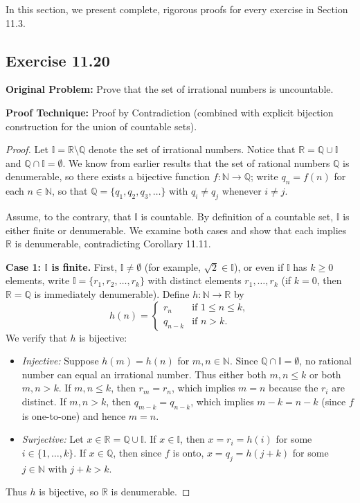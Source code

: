 \documentclass[11pt, letterpaper]{article}
\theoremstyle{definition}
\theoremstyle{remark}
\begin{document}
In this section, we present complete, rigorous proofs for every exercise in Section 11.3.

\subsection{Exercise 11.20}

\textbf{Original Problem:} Prove that the set of irrational numbers is uncountable.

\textbf{Proof Technique:} Proof by Contradiction (combined with explicit bijection construction for the union of countable sets).

\begin{proof}
Let $\mathbb{I} = \mathbb{R} \setminus \mathbb{Q}$ denote the set of irrational numbers. Notice that $\mathbb{R} = \mathbb{Q} \cup \mathbb{I}$ and $\mathbb{Q} \cap \mathbb{I} = \emptyset$. We know from earlier results that the set of rational numbers $\mathbb{Q}$ is denumerable, so there exists a bijective function $f : \mathbb{N} \to \mathbb{Q}$; write $q_n = f(n)$ for each $n \in \mathbb{N}$, so that $\mathbb{Q} = \{q_1, q_2, q_3, \dots\}$ with $q_i \neq q_j$ whenever $i \neq j$.

Assume, to the contrary, that $\mathbb{I}$ is countable. By definition of a countable set, $\mathbb{I}$ is either finite or denumerable. We examine both cases and show that each implies $\mathbb{R}$ is denumerable, contradicting Corollary 11.11.

\textbf{Case 1: $\mathbb{I}$ is finite.}
First, $\mathbb{I} \neq \emptyset$ (for example, $\sqrt{2} \in \mathbb{I}$), or even if $\mathbb{I}$ has $k \ge 0$ elements, write $\mathbb{I} = \{r_1, r_2, \dots, r_k\}$ with distinct elements $r_1, \dots, r_k$ (if $k = 0$, then $\mathbb{R} = \mathbb{Q}$ is immediately denumerable). Define $h : \mathbb{N} \to \mathbb{R}$ by
\[
h(n) = \begin{cases}
r_n & \text{if } 1 \le n \le k, \\
q_{n-k} & \text{if } n > k.
\end{cases}
\]
We verify that $h$ is bijective:
\begin{itemize}
    \item \emph{Injective:} Suppose $h(m) = h(n)$ for $m, n \in \mathbb{N}$. Since $\mathbb{Q} \cap \mathbb{I} = \emptyset$, no rational number can equal an irrational number. Thus either both $m, n \le k$ or both $m, n > k$. If $m, n \le k$, then $r_m = r_n$, which implies $m = n$ because the $r_i$ are distinct. If $m, n > k$, then $q_{m-k} = q_{n-k}$, which implies $m - k = n - k$ (since $f$ is one-to-one) and hence $m = n$.
    \item \emph{Surjective:} Let $x \in \mathbb{R} = \mathbb{Q} \cup \mathbb{I}$. If $x \in \mathbb{I}$, then $x = r_i = h(i)$ for some $i \in \{1, \dots, k\}$. If $x \in \mathbb{Q}$, then since $f$ is onto, $x = q_j = h(j + k)$ for some $j \in \mathbb{N}$ with $j + k > k$.
\end{itemize}
Thus $h$ is bijective, so $\mathbb{R}$ is denumerable.


\end{proof}
\end{document}
